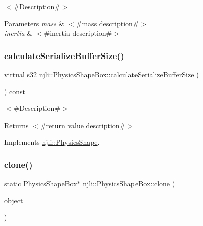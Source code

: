 $<$\#\+Description\#$>$


\begin{DoxyParams}{Parameters}
{\em mass} & $<$\#mass description\#$>$ \\
\hline
{\em inertia} & $<$\#inertia description\#$>$ \\
\hline
\end{DoxyParams}
\mbox{\label{classnjli_1_1_physics_shape_box_a0aa7607b93e89ea9fe1c6a73e44ec1d0}} 
\subsubsection{\texorpdfstring{calculate\+Serialize\+Buffer\+Size()}{calculateSerializeBufferSize()}}
{\footnotesize\ttfamily virtual \mbox{\hyperlink{_util_8h_aa62c75d314a0d1f37f79c4b73b2292e2}{s32}} njli\+::\+Physics\+Shape\+Box\+::calculate\+Serialize\+Buffer\+Size (\begin{DoxyParamCaption}{ }\end{DoxyParamCaption}) const\hspace{0.3cm}{\ttfamily [virtual]}}

$<$\#\+Description\#$>$

\begin{DoxyReturn}{Returns}
$<$\#return value description\#$>$ 
\end{DoxyReturn}


Implements \mbox{\hyperlink{classnjli_1_1_physics_shape_a0612a1c8c3f4520d78cb7f5838f03074}{njli\+::\+Physics\+Shape}}.

\mbox{\label{classnjli_1_1_physics_shape_box_aa04d5e621853d74464758ee5a48b6f73}} 
\subsubsection{\texorpdfstring{clone()}{clone()}}
{\footnotesize\ttfamily static \mbox{\hyperlink{classnjli_1_1_physics_shape_box}{Physics\+Shape\+Box}}$\ast$ njli\+::\+Physics\+Shape\+Box\+::clone (\begin{DoxyParamCaption}\item[{const \mbox{\hyperlink{classnjli_1_1_physics_shape_box}{Physics\+Shape\+Box}} \&}]{object }\end{DoxyParamCaption})\hspace{0.3cm}{\ttfamily [static]}}

